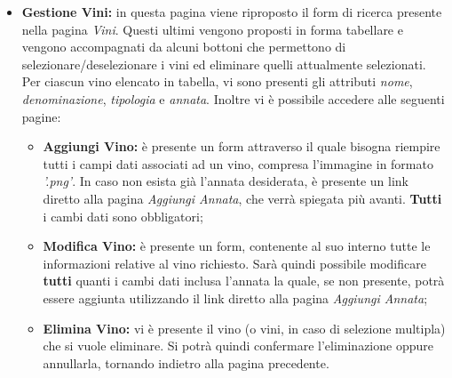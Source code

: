 \begin{itemize}
	\item \textbf{Gestione Vini:} in questa pagina viene riproposto il form di ricerca presente nella pagina \textit{Vini}. Questi ultimi vengono proposti in forma tabellare e vengono accompagnati da alcuni bottoni che permettono di selezionare/deselezionare i vini ed eliminare quelli attualmente selezionati. Per ciascun vino elencato in tabella, vi sono presenti gli attributi \textit{nome}, \textit{denominazione}, \textit{tipologia} e \textit{annata}. Inoltre vi è possibile accedere alle seguenti pagine:
		\begin{itemize}
			\item \textbf{Aggiungi Vino:} è presente un form attraverso il quale bisogna riempire tutti i campi dati associati ad un vino, compresa l'immagine in formato \textit{'.png'}. In caso non esista già l'annata desiderata, è presente un link diretto alla pagina \textit{Aggiungi Annata}, che verrà spiegata più avanti. \textbf{Tutti} i cambi dati sono obbligatori;
			\item \textbf{Modifica Vino:} è presente un form, contenente al suo interno tutte le informazioni relative al vino richiesto. Sarà quindi possibile modificare \textbf{tutti} quanti i cambi dati inclusa l'annata la quale, se non presente, potrà essere aggiunta utilizzando il link diretto alla pagina \textit{Aggiungi Annata};
			\item \textbf{Elimina Vino:} vi è presente il vino (o vini, in caso di selezione multipla) che si vuole eliminare. Si potrà quindi confermare l'eliminazione oppure annullarla, tornando indietro alla pagina precedente.
		\end{itemize}
	

\end{itemize}
